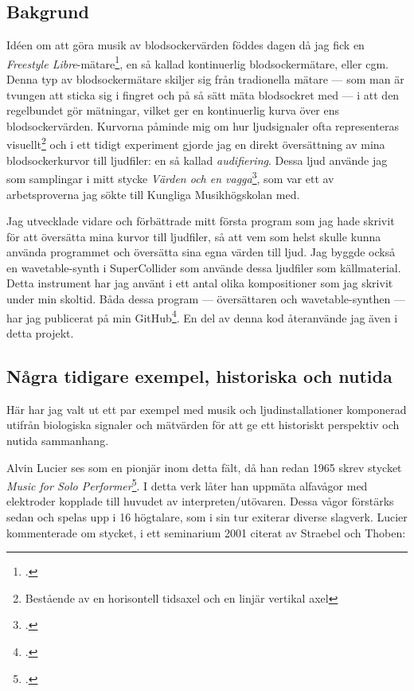 \documentclass[11pt, a4paper]{article} %
\begin{document}
\subsection*{Bakgrund}
Idéen om att göra musik av blodsockervärden föddes dagen då jag fick en \emph{Freestyle Libre}-mätare\footcite{noauthor_glukosovervakningssystem_nodate}, en så kallad kontinuerlig blodsockermätare, eller \gls{cgm}. Denna typ av blodsockermätare skiljer sig från tradionella mätare --- som man är tvungen att sticka sig i fingret och på så sätt mäta blodsockret med --- i att den regelbundet gör mätningar, vilket ger en kontinuerlig kurva över ens blodsockervärden.  Kurvorna påminde mig om hur ljudsignaler ofta representeras visuellt\footnote{Bestående av en horisontell tidsaxel och en linjär vertikal axel} och i ett tidigt experiment gjorde jag en direkt översättning av mina blodsockerkurvor till ljudfiler: en så kallad \emph{audifiering}. Dessa ljud använde jag som samplingar i mitt stycke \emph{Värden och en vagga}\footcite{jondell_varden_2017}, som var ett av arbetsproverna jag sökte till Kungliga Musikhögskolan med. 

Jag utvecklade vidare och förbättrade mitt första program som jag hade skrivit för att översätta mina kurvor till ljudfiler, så att vem som helst skulle kunna använda programmet och översätta sina egna värden till ljud. Jag byggde också en wavetable-synth i SuperCollider som använde dessa ljudfiler som källmaterial. Detta instrument har jag använt i ett antal olika kompositioner som jag skrivit under min skoltid. Båda dessa program --- översättaren och wavetable-synthen --- har jag publicerat på min GitHub\footcite{jondell_kj-jondelldiabetes-synth_2021}. En del av denna kod återanvände jag även i detta projekt.

\subsection*{Några tidigare exempel, historiska och nutida}
Här har jag valt ut ett par exempel med musik och ljudinstallationer komponerad utifrån biologiska signaler och mätvärden för att ge ett historiskt perspektiv och nutida sammanhang.

Alvin Lucier ses som en pionjär inom detta fält, då han redan 1965 skrev stycket \emph{Music for Solo Performer}\footcite{lucier_music_1965}. I detta verk låter han uppmäta alfavågor med elektroder kopplade till huvudet av interpreten/utövaren. Dessa vågor förstärks sedan och spelas upp i 16 högtalare, som i sin tur exiterar diverse slagverk. Lucier kommenterade om stycket, i ett seminarium 2001 citerat av Straebel och Thoben:
\end{document}
